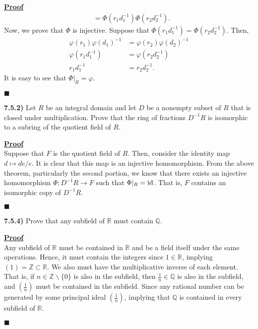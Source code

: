 \documentclass[12pt,a4paper]{article}
\newcommand{\prob}[2]{\textbf{#1)} #2}
\newenvironment{proof}
{
\textbf{\underline{Proof}} \\
}
{
\hfill $\blacksquare$
}
\begin{document}
\begin{proof}
\begin{align*}
        &= \Phi\left( r_1 d_1^{-1} \right)\Phi\left( r_2 d_2^{-1} \right)
    .\end{align*}
    Now, we prove that $\Phi$ is injective.
    Suppose that $\Phi\left( r_1 d_1^{-1} \right) = \Phi\left( r_2 d_2^{-1} \right)$.
    Then, 
    \begin{align*}
        \varphi\left( r_1 \right)\varphi\left( d_1 \right)^{-1} &= \varphi\left( r_2 \right)\varphi\left( d_2 \right)^{-1} \\
        \varphi\left( r_1 d_1^{-1} \right) &= \varphi\left( r_2 d_2^{-1} \right) \\
        r_1 d_1^{-1} &= r_2 d_2^{-1}
    .\end{align*}
    It is easy to see that $\Phi|_{R} = \varphi$.
\end{proof}

\prob{7.5.2}{
Let $R$ be an integral domain and let $D$ be a nonempty subset of $R$ that is closed under multiplication.
Prove that the ring of fractions $D^{-1}R$ is isomorphic to a subring of the quotient field of $R$.
}

\begin{proof}
    Suppose that $F$ is the quotient field of $R$.
    Then, consider the identity map $d \mapsto de/e$.
    It is clear that this map is an injective homomorphism.
    From the above theorem, particularly the second portion, we know that there exists an injective homomorphism $\Phi: D^{-1}R \to F$ such that $\Phi|_{R} = {\rm id}$.
    That is, $F$ contains an isomorphic copy of $D^{-1}R$.
\end{proof}

\prob{7.5.4}{
Prove that any subfield of $\mathbb{R}$ must contain $\mathbb{Q}$.
}
 
\begin{proof}
    Any subfield of $\mathbb{R}$ must be contained in $\mathbb{R}$ and be a field itself under the same operations.
    Hence, it must contain the integers since $1 \in \mathbb{R}$, implying $(1) = \mathbb{Z} \subset \mathbb{R}$.
    We also must have the multiplicative inverse of each element.
    That is, if $n \in \mathbb{Z} \backslash \{ 0 \} $ is also in the subfield, then $\frac{1}{n} \in \mathbb{Q}$ is also in the subfield, and $\left( \frac{1}{n} \right)$ must be contained in the subfield.
    Since any rational number can be generated by some principal ideal $\left( \frac{1}{n} \right)$, implying that $\mathbb{Q}$ is contained in every subfield of $\mathbb{R}$.
\end{proof}
\end{document}
